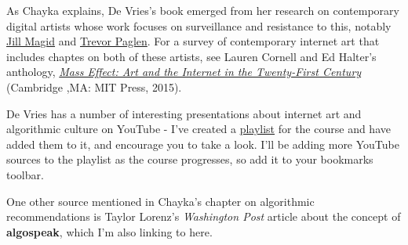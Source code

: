 \documentclass[
  letterpaper,
  DIV=11,
  numbers=noendperiod,
  oneside]{scrartcl}
\begin{document}
As Chayka explains, De Vries's book emerged from her research on
contemporary digital artists whose work focuses on surveillance and
resistance to this, notably
\href{https://www.jillmagid.com/projects}{Jill Magid} and
\href{https://paglen.studio/}{Trevor Paglen}. For a survey of
contemporary internet art that includes chaptes on both of these
artists, see Lauren Cornell and Ed Halter's anthology,
\href{https://mitpress.mit.edu/9780262029261/mass-effect/}{\emph{Mass
Effect: Art and the Internet in the Twenty-First Century}} (Cambridge
,MA: MIT Press, 2015).


De Vries has a number of interesting presentations about internet art
and algorithmic culture on YouTube - I've created a
\href{https://www.youtube.com/playlist?list=PLx7AcHafElRiGpYPLRM29YzNMMEXyDqmh}{playlist}
for the course and have added them to it, and encourage you to take a
look. I'll be adding more YouTube sources to the playlist as the course
progresses, so add it to your bookmarks toolbar.

One other source mentioned in Chayka's chapter on algorithmic
recommendations is Taylor Lorenz's \emph{Washington Post} article about
the concept of \textbf{algospeak}, which I'm also linking to
here.{}
\end{document}
